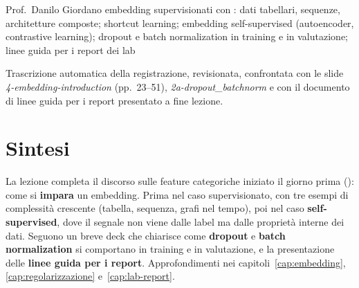   {Prof.~Danilo Giordano}
  {embedding supervisionati con : dati tabellari, sequenze, architetture composte;
   shortcut learning; embedding self-supervised (autoencoder, contrastive learning); dropout e batch
   normalization in training e in valutazione; linee guida per i report dei lab}
\label{lez:2026-10-20}

\begin{nota}[Fonte]
Trascrizione automatica della registrazione, revisionata, confrontata con le slide
\emph{4-embedding-introduction} (pp.~23--51), \emph{2a-dropout\_batchnorm} e con il documento di linee guida
per i report presentato a fine lezione.
\end{nota}

\section{Sintesi}
La lezione completa il discorso sulle feature categoriche iniziato il giorno prima ():
come si \textbf{impara} un embedding. Prima nel caso supervisionato, con tre esempi di complessità
crescente (tabella, sequenza, grafi nel tempo), poi nel caso \textbf{self-supervised}, dove il segnale non
viene dalle label ma dalle proprietà interne dei dati. Seguono un breve deck che chiarisce come
\textbf{dropout} e \textbf{batch normalization} si comportano in training e in valutazione, e la
presentazione delle \textbf{linee guida per i report}. Approfondimenti nei capitoli~\ref{cap:embedding},
\ref{cap:regolarizzazione} e~\ref{cap:lab-report}.

